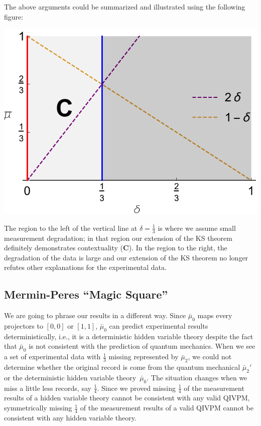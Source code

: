 \documentclass[english,reprint, aps, prl,superscriptaddress, showpacs,
showkeys, longbibliography, amsmath, amssymb, floatfix]{revtex4-1}
\theoremstyle{plain}
\theoremstyle{definition}
\newcommand{\imposs}{\ensuremath{\left[0,0\right]}}
\newcommand{\necess}{\ensuremath{\left[1,1\right]}}
\begin{document}
The above arguments could be summarized and illustrated using the
following figure: 
\begin{center}
\includegraphics[scale=0.5]{prop_letter_ajhs_referee_response_nb} 
\par\end{center}

\noindent The region to the left of the vertical line at
$\delta=\frac{1}{3}$ is where we assume small measurement degradation;
in that region our extension of the KS theorem definitely demonstrates
contextuality ({\bf{\sf C}}). In the region to the right, the degradation of the data
is large and our extension of the KS theorem no longer refutes other
explanations for the experimental data.

\subsection*{Mermin-Peres ``Magic Square''}

We are going to phrase our results in a different way. Since $\bar{\mu}_{0}$
maps every projectors to $\imposs$ or $\necess$, $\bar{\mu}_{0}$
can predict experimental results deterministically, i.e., it is a
deterministic hidden variable theory despite the fact that $\bar{\mu}_{0}$
is not consistent with the prediction of quantum mechanics. When we
see a set of experimental data with $\frac{1}{3}$ missing represented
by $\bar{\mu}_{2}$, we could not determine whether the original record
is come from the quantum mechanical $\bar{\mu}_{2}'$ or the deterministic
hidden variable theory~$\bar{\mu}_{0}$. The situation changes when
we miss a little less records, say $\frac{1}{4}$. Since we proved
missing $\frac{1}{4}$ of the measurement results of a hidden variable
theory cannot be consistent with any valid QIVPM, symmetrically missing
$\frac{1}{4}$ of the measurement results of a valid QIVPM cannot
be consistent with any hidden variable theory.
\end{document}
